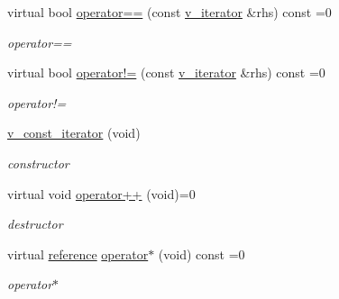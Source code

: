 \begin{DoxyCompactItemize}
virtual bool \mbox{\hyperlink{group___thin_var_dep_interface___c_l_a_s_s_e_s_ga165c06b6e2a096f5e53417077791cacb}{operator==}} (const \mbox{\hyperlink{class_s_m_spp__di__unipi__it_1_1_thin_var_dep_interface_1_1v__iterator}{v\+\_\+iterator}} \&rhs) const =0
\begin{DoxyCompactList}\small\item\em operator== \end{DoxyCompactList}\item 
\mbox{\label{group___thin_var_dep_interface___c_l_a_s_s_e_s_ga65d7322ccac278cb028219cbedcd0494}} 
virtual bool \mbox{\hyperlink{group___thin_var_dep_interface___c_l_a_s_s_e_s_ga65d7322ccac278cb028219cbedcd0494}{operator!=}} (const \mbox{\hyperlink{class_s_m_spp__di__unipi__it_1_1_thin_var_dep_interface_1_1v__iterator}{v\+\_\+iterator}} \&rhs) const =0
\begin{DoxyCompactList}\small\item\em operator!= \end{DoxyCompactList}\item 
\mbox{\label{group___thin_var_dep_interface___c_l_a_s_s_e_s_ga4dd97dbbd38cc26107a54416354a2a01}} 
\mbox{\hyperlink{group___thin_var_dep_interface___c_l_a_s_s_e_s_ga4dd97dbbd38cc26107a54416354a2a01}{v\+\_\+const\+\_\+iterator}} (void)
\begin{DoxyCompactList}\small\item\em constructor \end{DoxyCompactList}\item 
virtual void \mbox{\hyperlink{group___thin_var_dep_interface___c_l_a_s_s_e_s_ga79fc9d17094dc591d6b48bc296028d51}{operator++}} (void)=0
\begin{DoxyCompactList}\small\item\em destructor \end{DoxyCompactList}\item 
\mbox{\label{group___thin_var_dep_interface___c_l_a_s_s_e_s_gabce2a2d16159da29402d5561d6e0e28c}} 
virtual \mbox{\hyperlink{class_s_m_spp__di__unipi__it_1_1_variable}{reference}} \mbox{\hyperlink{group___thin_var_dep_interface___c_l_a_s_s_e_s_gabce2a2d16159da29402d5561d6e0e28c}{operator$\ast$}} (void) const =0
\begin{DoxyCompactList}\small\item\em operator$\ast$ \end{DoxyCompactList}\item 

\end{DoxyCompactItemize}
